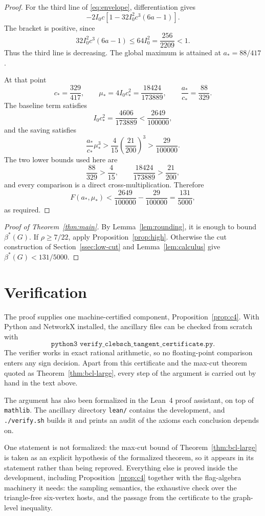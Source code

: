 \documentclass[11pt,reqno]{amsart}
\theoremstyle{plain}
\newcommand{\optf}{\beta^{*}}
\newcommand{\dens}{\rho}
\begin{document}
\begin{proof}
For the third line of \eqref{eq:envelope}, differentiation gives
\[
 -2I_0c\left[1-32I_0^2c^3(6a-1)\right].
\]
The bracket is positive, since
\[
 32I_0^2c^3(6a-1)\le64I_0^2=\frac{256}{2209}<1.
\]
Thus the third line is decreasing.  The global maximum is attained at
$a_*=88/417$.

At that point
\[
 c_*=\frac{329}{417},\qquad
 \mu_*=4I_0c_*^2=\frac{18424}{173889},\qquad
 \frac{a_*}{c_*}=\frac{88}{329}.
\]
The baseline term satisfies
\[
 I_0c_*^2=\frac{4606}{173889}<\frac{2649}{100000},
\]
and the saving satisfies
\[
 \frac{a_*}{c_*}\mu_*^3
 >\frac4{15}\left(\frac{21}{200}\right)^3
 >\frac{29}{100000}.
\]
The two lower bounds used here are
\[
 \frac{88}{329}>\frac4{15},\qquad
 \frac{18424}{173889}>\frac{21}{200},
\]
and every comparison is a direct cross-multiplication.  Therefore
\[
 F(a_*,\mu_*)
 <\frac{2649}{100000}-\frac{29}{100000}
 =\frac{131}{5000},
\]
as required.
\end{proof}

\begin{proof}[Proof of Theorem~\ref{thm:main}]
By Lemma~\ref{lem:rounding}, it is enough to bound $\optf(G)$.  If
$\dens\ge7/22$,
apply Proposition~\ref{prop:high}.  Otherwise the cut construction of
Section~\ref{ssec:low-cut} and Lemma~\ref{lem:calculus} give
$\optf(G)<131/5000$.
\end{proof}

\section{Verification}\label{sec:verification}

The proof supplies one machine-certified component,
Proposition~\ref{prop:c4}.  With Python and NetworkX installed, the ancillary
files can be checked from scratch with
\[
 \texttt{python3 verify\_clebsch\_tangent\_certificate.py}.
\]
The verifier works in exact rational arithmetic, so no floating-point
comparison enters any sign decision.  Apart from this certificate and the
max-cut theorem quoted as Theorem~\ref{thm:bcl-large}, every step of the
argument is carried out by hand in the text above.

The argument has also been formalized in the Lean~4 proof assistant, on top of
\texttt{mathlib}.  The ancillary directory \texttt{lean/} contains the
development, and \texttt{./verify.sh} builds it and prints an audit of the
axioms each conclusion depends on.

One statement is not formalized: the max-cut bound of
Theorem~\ref{thm:bcl-large} is taken as an explicit hypothesis of the
formalized theorem, so it appears in
its statement rather than being reproved.  Everything else is proved inside the
development, including Proposition~\ref{prop:c4} together with the
flag-algebra machinery it needs: the sampling semantics, the exhaustive check
over the triangle-free six-vertex hosts, and the passage from the certificate
to the graph-level inequality.
\end{document}
